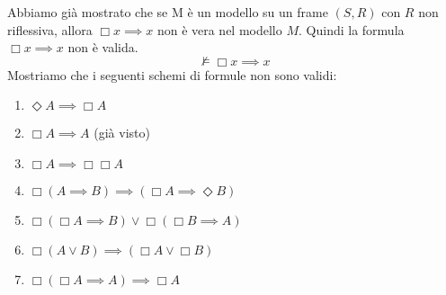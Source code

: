 \documentclass[../main.tex]{subfiles}
\begin{document}
Abbiamo già mostrato che se M è un modello su un frame $(S,R)$ con $R$ non riflessiva, allora $\Box x \implies x$ non è vera nel modello $M$. Quindi la formula $\Box x \implies x$ non è valida.
\begin{equation*}
    \nvDash \Box x \implies x
\end{equation*}
Mostriamo che i seguenti schemi di formule non sono validi:
\begin{enumerate}
    \item $\Diamond A \implies \Box A$
    \item $\Box A \implies A$ (già visto)
    \item $\Box A \implies \Box \Box A$
    \item $\Box (A \implies B) \implies (\Box A \implies \Diamond B)$
    \item $\Box (\Box A \implies B) \lor \Box (\Box B \implies A)$
    \item $\Box (A \lor B) \implies (\Box A \lor \Box B)$
    \item $\Box(\Box A \implies A) \implies \Box A$
\end{enumerate}
\end{document}
